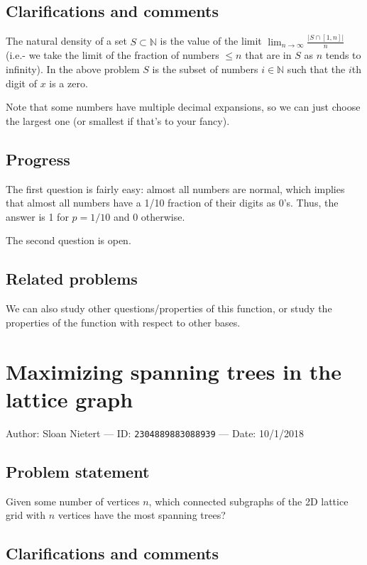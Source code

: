 \documentclass[10pt]{article}
\begin{document}
\subsection{Clarifications and comments}

The natural density of a set $S\subset\mathbb{N}$ is the value of the limit $\lim_{n\to\infty}\frac{\lvert S\cap[1,n]\rvert}{n}$ (i.e.- we take the limit of the fraction of numbers $\leq n$ that are in $S$ as $n$ tends to infinity). In the above problem $S$ is the subset of numbers $i\in\mathbb{N}$ such that the $i$th digit of $x$ is a zero.

Note that some numbers have multiple decimal expansions, so we can just choose the largest one (or smallest if that's to your fancy).

\subsection{Progress}

The first question is fairly easy: almost all numbers are normal, which implies that almost all numbers have a 1/10 fraction of their digits as 0's. Thus, the answer is 1 for $p=1/10$ and 0 otherwise.

The second question is open.

\subsection{Related problems}

We can also study other questions/properties of this function, or study the properties of the function with respect to other bases.

\pagebreak

\section{Maximizing spanning trees in the lattice graph}

Author: Sloan Nietert --- ID: \verb`2304889883088939` --- Date: 10/1/2018

\subsection{Problem statement}

Given some number of vertices $n$, which connected subgraphs of the 2D lattice grid with $n$ vertices have the most spanning trees?

\subsection{Clarifications and comments}
\end{document}
